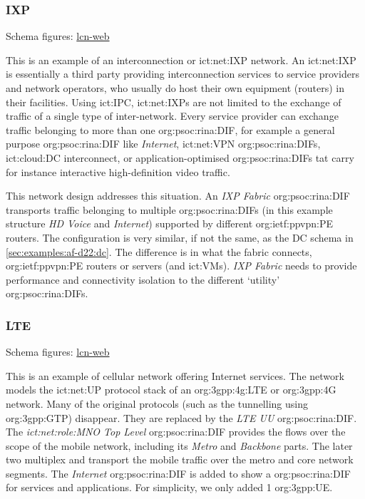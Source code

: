 \subsubsection{IXP}
\label{sec:examples:af-d22:ixp}
Schema figures: \href{https://vdmeer.github.io/skb/ipc/lcn-examples/arcfire/af-d22-ixp/index.html}{lcn-web}

This is an example of an interconnection or \ac{ict:net:IXP} network.
An \ac{ict:net:IXP} is essentially a third party providing interconnection services to service providers and network operators, who usually do host their own equipment (routers) in their facilities.
Using \ac{ict:IPC}, \acp{ict:net:IXP} are not limited to the exchange of traffic of a single type of inter-network.
Every service provider can exchange traffic belonging to more than one \ac{org:psoc:rina:DIF}, for example
    a general purpose \ac{org:psoc:rina:DIF} like \textit{Internet},
    \acs{ict:net:VPN} \acp{org:psoc:rina:DIF},
    \acs{ict:cloud:DC} interconnect, or
    application-optimised \acp{org:psoc:rina:DIF} tat carry for instance interactive high-definition video traffic.

This network design addresses this situation.
An \textit{IXP Fabric} \ac{org:psoc:rina:DIF} transports traffic belonging to multiple \acp{org:psoc:rina:DIF} (in this example structure \textit{HD Voice} and \textit{Internet}) supported by different \ac{org:ietf:ppvpn:PE} routers.
The configuration is very similar, if not the same, as the DC schema in \autoref{sec:examples:af-d22:dc}.
The difference is in what the fabric connects, \ac{org:ietf:ppvpn:PE} routers or servers (and \acp{ict:VM}).
\textit{IXP Fabric} needs to provide performance and connectivity isolation to the different `utility' \acp{org:psoc:rina:DIF}.



\subsubsection{LTE}
\label{sec:examples:af-d22:lte}
Schema figures: \href{https://vdmeer.github.io/skb/ipc/lcn-examples/arcfire/af-d22-lte/index.html}{lcn-web}

This is an example of cellular network offering Internet services.
The network models the \ac{ict:net:UP} protocol stack of an \acs{org:3gpp:4g:LTE} or \acs{org:3gpp:4G} network.
Many of the original protocols (such as the tunnelling using \acs{org:3gpp:GTP}) disappear.
They are replaced by the \textit{LTE UU} \ac{org:psoc:rina:DIF}.
The \textit{\acs{ict:net:role:MNO} Top Level} \ac{org:psoc:rina:DIF} provides the flows over the scope of the mobile network, including its \textit{Metro} and \textit{Backbone} parts.
The later two multiplex and transport the mobile traffic over the metro and core network segments.
The \textit{Internet} \ac{org:psoc:rina:DIF} is added to show a \ac{org:psoc:rina:DIF} for services and applications.
For simplicity, we only added 1 \acs{org:3gpp:UE}.



